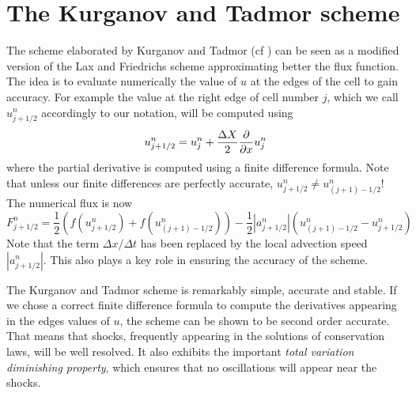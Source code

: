 \section{The Kurganov and Tadmor scheme}

The scheme elaborated by Kurganov and Tadmor (cf \cite{KT}) can be seen as a modified version of the Lax and Friedrichs scheme approximating better the flux function. 
The idea is to evaluate numerically the value of $u$ at the edges of the cell to gain accuracy. For example the value at the right edge of cell number $j$, which we call $u^n_{j+1/2}$ accordingly to our notation, will be computed using
\begin{equation}
	u^n_{j+1/2} = u^n_j + \frac{\Delta X}{2}  \frac{\partial {}}{\partial {x}} u^n_j
\end{equation}
where the partial derivative is computed using a finite difference formula.
Note that unless our finite differences are perfectly accurate, $u^n_{j+1/2} \neq u^n_{(j+1) - 1/2}$!
The numerical flux is now
\begin{equation}
	F^n_{j+1/2} = \frac{1}{2} \left( f(u^n_{j+1/2}) + f(u^n_{(j+1)-1/2}) \right) - \frac{1}{2} | a^n_{j+1/2} | \left( u^n_{(j+1)-1/2} - u^n_{j+1/2} \right)
\end{equation}
Note that the term $\Delta x/\Delta t$ has been replaced by the local advection speed $| a_{j+1/2}^n|$. This also plays a key role in ensuring the accuracy of the scheme.

The Kurganov and Tadmor scheme is remarkably simple, accurate and stable. 
If we chose a correct finite difference formula to compute the derivatives appearing in the edges values of $u$, the scheme can be shown to be second order accurate. That means that shocks, frequently appearing in the solutions of conservation laws, will be well resolved. It also exhibits the important \textit{total variation diminishing property}, which ensures that no oscillations will appear near the shocks. 
